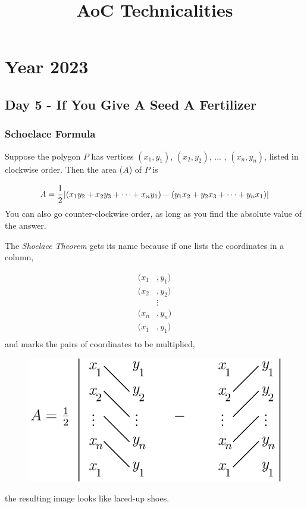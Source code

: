 \documentclass[]{scrartcl}
\title{AoC Technicalities}
\author{}
\begin{document}
\maketitle

\section{Year 2023}

\subsection{Day 5 - If You Give A Seed A Fertilizer}
\subsubsection{Schoelace Formula}

Suppose the polygon $P$ has vertices $(x_1, y_1)$, $(x_2, y_2)$, ... , $(x_n, y_n)$, listed in clockwise order. Then the area ($A$) of $P$ is

\begin{equation}
A = \cfrac{1}{2} \left|(x_1y_2 + x_2y_3 + \cdots + x_ny_1) - (y_1x_2 + y_2x_3 + \cdots + y_nx_1) \right|
\end{equation}
You can also go counter-clockwise order, as long as you find the absolute value of the answer.

The \emph{Shoelace Theorem} gets its name because if one lists the coordinates in a column,

\begin{align*} 
	(x_1 &, y_1) \\ 
	(x_2 &, y_2) \\ & \vdots \\ (x_n &, y_n) \\ (x_1 &, y_1) \\ 
\end{align*}
and marks the pairs of coordinates to be multiplied,

\begin{figure}[htbp]
\centering
\includegraphics[width=0.45\linewidth]{schoelace}
\end{figure}
the resulting image looks like laced-up shoes.
\end{document}
